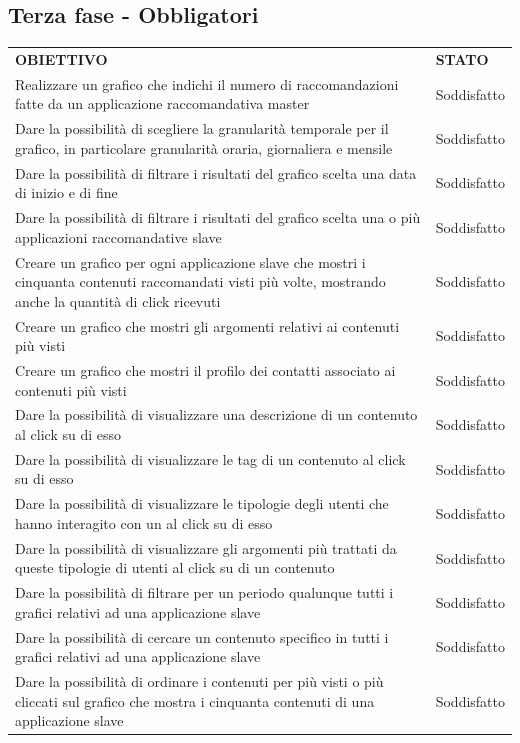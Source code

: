 \documentclass[a4paper, 12pt, twoside, openright]{book}
\begin{document}
\subsection{Terza fase - Obbligatori}
\begin{tabular}{ m{26em} | m{5em} }
	\rowcolor{gray!50}
	\textbf{OBIETTIVO} & \textbf{STATO}\\
	Realizzare un grafico che indichi il numero di raccomandazioni fatte da un applicazione raccomandativa master & Soddisfatto\\
	Dare la possibilità di scegliere la granularità temporale per il grafico, in particolare granularità oraria, giornaliera e mensile & Soddisfatto\\
	Dare la possibilità di filtrare i risultati del grafico scelta una data di inizio e di fine & Soddisfatto\\
	Dare la possibilità di filtrare i risultati del grafico scelta una o più applicazioni raccomandative slave & Soddisfatto\\
	Creare un grafico per ogni applicazione slave che mostri i cinquanta contenuti raccomandati visti più volte, mostrando anche la quantità di click ricevuti & Soddisfatto\\
	Creare un grafico che mostri gli argomenti relativi ai contenuti più visti & Soddisfatto\\
	Creare un grafico che mostri il profilo dei contatti associato ai contenuti più visti & Soddisfatto\\
	Dare la possibilità di visualizzare una descrizione di un contenuto al click su di esso & Soddisfatto\\
	Dare la possibilità di visualizzare le tag di un contenuto al click su di esso & Soddisfatto\\
	Dare la possibilità di visualizzare le tipologie degli utenti che hanno interagito con un al click su di esso & Soddisfatto\\
	Dare la possibilità di visualizzare gli argomenti più trattati da queste tipologie di utenti al click su di un contenuto & Soddisfatto\\
	Dare la possibilità di filtrare per un periodo qualunque tutti i grafici relativi ad una applicazione slave & Soddisfatto\\
	Dare la possibilità di cercare un contenuto specifico in tutti i grafici relativi ad una applicazione slave & Soddisfatto\\
	Dare la possibilità di ordinare i contenuti per più visti o più cliccati sul grafico che mostra i cinquanta contenuti di una applicazione slave & Soddisfatto\\
\end{tabular}
\end{document}
